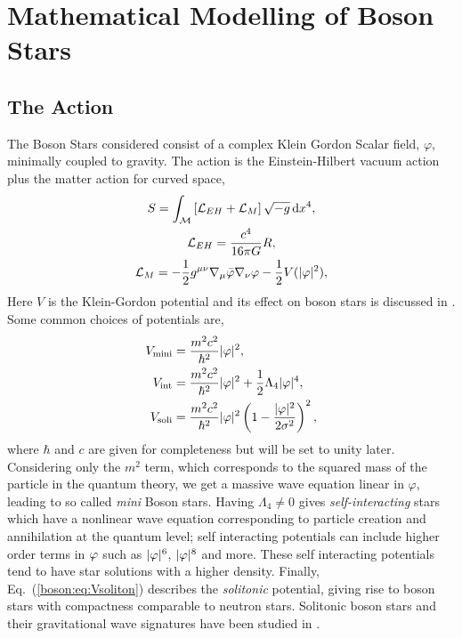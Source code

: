 





\section{Mathematical Modelling of Boson Stars}
\subsection{The Action} \label{boson:sec:action}
The Boson Stars considered consist of a complex Klein Gordon Scalar field, $\varphi$, minimally coupled to gravity. The action is the Einstein-Hilbert vacuum action plus the matter action for curved space,
\begin{gather} S = \int_\mathcal{M}\left[\mathcal{L}_{EH} + \mathcal{L}_M\right] \sqrt{-g}\,\dd x^4, \\
 \mathcal{L}_{EH} = \frac{c^4}{16\pi G}R, \\
 \mathcal{L}_{M} =-\frac{1}{2}g^{\mu\nu}\nabla_\mu \bar{\varphi} \nabla_\nu \varphi - \frac{1}{2}V(|\varphi|^2),  \end{gather}
Here $V$ is the Klein-Gordon potential and its effect on boson stars is discussed in \cite{Schunck:2003kk} \cite{Liebling:2012fv}. Some common choices of potentials are,
\begin{align}
V_{\rm mini} &= \frac{m^2 c^2}{\hbar^2 }|\varphi|^2,\label{boson:eq:Vmini} \\
V_{\rm int} &= \frac{m^2 c^2}{\hbar^2 }|\varphi|^2 + \frac{1}{2}\Lambda_4|\varphi|^4 ,\\
V_{\rm soli} &= \frac{m^2 c^2}{\hbar^2 }|\varphi|^2\left(1-\frac{|\varphi|^2}{2\sigma^2}\right)^2 , \label{boson:eq:Vsoliton}
\end{align}
where $\hbar$ and $c$ are given for completeness but will be set to unity later.
Considering only the $m^2$ term, which corresponds to the squared mass of the particle in the quantum theory, we get a massive wave equation linear in $\varphi$, leading to so called {\it mini} Boson stars. Having $\Lambda_4\neq0$ gives {\it self-interacting} stars which have a nonlinear wave equation corresponding to particle creation and annihilation at the quantum level; self interacting potentials can include higher order terms in $\varphi$ such as $|\varphi|^6$, $|\varphi|^8$ and more. These self interacting potentials tend to have star solutions with a higher density. Finally, Eq.~(\ref{boson:eq:Vsoliton}) describes the {\it solitonic} potential, giving rise to boson stars with compactness comparable to neutron stars. Solitonic boson stars and their gravitational
wave signatures have been studied in \cite{Palenzuela:2017kcg}.

